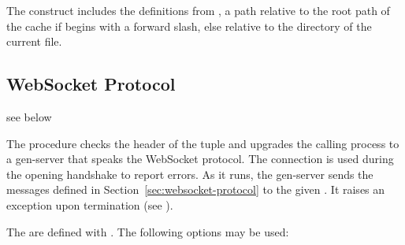 \begin{syntax}
\end{syntax}\antipar
{}

\begin{syntax}
\end{syntax}\antipar

The  construct includes the definitions from
, a path relative to the root path of the cache if
 begins with a forward slash, else relative to the
directory of the current file.


\subsection {WebSocket Protocol}

\begin{procedure}
\end{procedure}
\returns{} see below

The  procedure checks the header of the 
tuple and upgrades the calling process to a gen-server that speaks the
WebSocket protocol. The connection  is used during the
opening handshake to report errors. As it runs, the gen-server sends
the messages defined in Section~\ref{sec:websocket-protocol} to the
given . It raises an exception upon termination (see
).

The  are defined with . The following options may be used:

